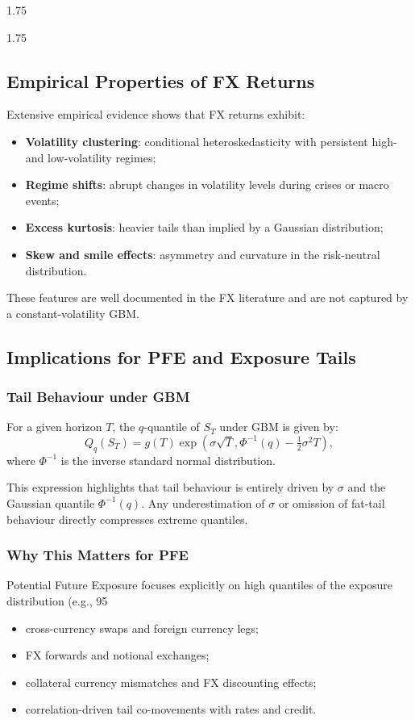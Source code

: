 \begin{spacing}{1.75}
\begin{spacing}{1.75}
		\subsection{Empirical Properties of FX Returns}
		Extensive empirical evidence shows that FX returns exhibit:
		\begin{itemize}
			\item \textbf{Volatility clustering}: conditional heteroskedasticity with persistent high- and low-volatility regimes;
			\item \textbf{Regime shifts}: abrupt changes in volatility levels during crises or macro events;
			\item \textbf{Excess kurtosis}: heavier tails than implied by a Gaussian distribution;
			\item \textbf{Skew and smile effects}: asymmetry and curvature in the risk-neutral distribution.
		\end{itemize}
		
		These features are well documented in the FX literature and are not captured by a constant-volatility GBM.
		
		\subsection{Implications for PFE and Exposure Tails}
		
		\subsubsection{Tail Behaviour under GBM}
		For a given horizon $T$, the $q$-quantile of $S_T$ under GBM is given by:
		\begin{equation}
			Q_q(S_T) = g(T)\exp\left(\sigma\sqrt{T},\Phi^{-1}(q) - \tfrac{1}{2}\sigma^2 T\right),
		\end{equation}
		where $\Phi^{-1}$ is the inverse standard normal distribution.
		
		This expression highlights that tail behaviour is entirely driven by $\sigma$ and the Gaussian quantile $\Phi^{-1}(q)$. Any underestimation of $\sigma$ or omission of fat-tail behaviour directly compresses extreme quantiles.
		
		\subsubsection{Why This Matters for PFE}
		Potential Future Exposure focuses explicitly on high quantiles of the exposure distribution (e.g., 95%
		\begin{itemize}
			\item cross-currency swaps and foreign currency legs;
			\item FX forwards and notional exchanges;
			\item collateral currency mismatches and FX discounting effects;
			\item correlation-driven tail co-movements with rates and credit.
		\end{itemize}
		

\end{spacing}
\end{spacing}
